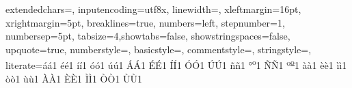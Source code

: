 \usepackage{listings}

\usepackage{textcomp}

\lstset
{
    extendedchars=\true,%
    inputencoding=utf8x,%
    linewidth=\textwidth,%
    xleftmargin=16pt,%
    xrightmargin=5pt,%
    breaklines=true,%
    numbers=left,%
    stepnumber=1,%
    numbersep=5pt,%
    tabsize=4,showtabs=false,%
    showstringspaces=false,%
    upquote=true,%
    numberstyle=\tiny,%
    basicstyle=\ttfamily\scriptsize,%
    commentstyle=\color{Gray},%
    stringstyle=\color{BrickRed},%
    literate={á}{{\'a}}1   {é}{{\'e}}1   {í}{{\'i}}1   {ó}{{\'o}}1   {ú}{{\'u}}1
             {Á}{{\'A}}1   {É}{{\'E}}1   {Í}{{\'I}}1   {Ó}{{\'O}}1   {Ú}{{\'U}}1
             {ñ}{{\~n}}1   {°}{{\textsuperscript{o}}}1
             {Ñ}{{\~N}}1   {º}{{\textsuperscript{\underline{o}}}}1
             {à}{{\`a}}1   {è}{{\`e}}1   {ì}{{\`i}}1   {ò}{{\`o}}1   {ù}{{\`u}}1
             {À}{{\`A}}1   {È}{{\`E}}1   {Ì}{{\`I}}1   {Ò}{{\`O}}1   {Ù}{{\`U}}1
}


